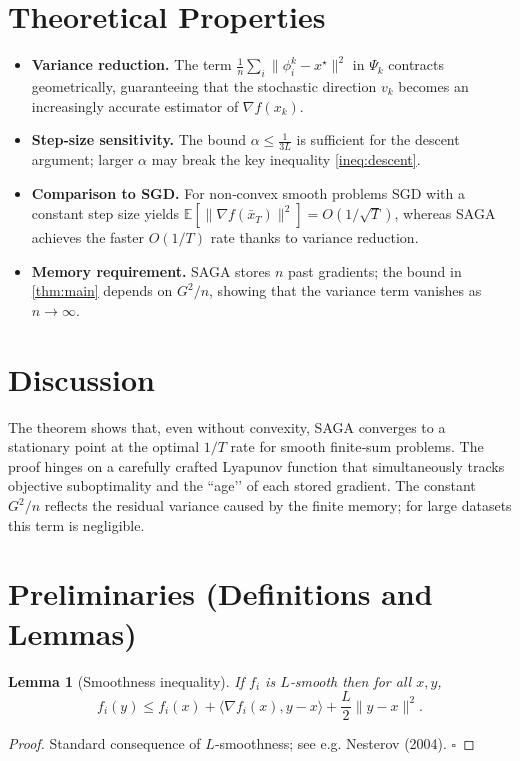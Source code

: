 \documentclass{article}
\newtheorem{lemma}{Lemma}
\newcommand{\EE}{\mathbb{E}}
\begin{document}
\section*{Theoretical Properties}
\begin{itemize}
    \item \textbf{Variance reduction.} The term $\frac{1}{n}\sum_{i}\|\phi_i^{k}-x^{\star}\|^{2}$ in $\Psi_k$ contracts geometrically, guaranteeing that the stochastic direction $v_k$ becomes an increasingly accurate estimator of $\nabla f(x_k)$.
    \item \textbf{Step‑size sensitivity.} The bound $\alpha\le \frac{1}{3L}$ is sufficient for the descent argument; larger $\alpha$ may break the key inequality \eqref{ineq:descent}.
    \item \textbf{Comparison to SGD.} For non‑convex smooth problems SGD with a constant step size yields $\EE[\|\nabla f(\bar x_T)\|^{2}]=O(1/\sqrt{T})$, whereas SAGA achieves the faster $O(1/T)$ rate thanks to variance reduction.
    \item \textbf{Memory requirement.} SAGA stores $n$ past gradients; the bound in \eqref{thm:main} depends on $G^{2}/n$, showing that the variance term vanishes as $n\to\infty$.
\end{itemize}

\section*{Discussion}
The theorem shows that, even without convexity, SAGA converges to a stationary point at the optimal $1/T$ rate for smooth finite‑sum problems. The proof hinges on a carefully crafted Lyapunov function that simultaneously tracks objective suboptimality and the “age’’ of each stored gradient. The constant $G^{2}/n$ reflects the residual variance caused by the finite memory; for large datasets this term is negligible.

\section*{Preliminaries (Definitions and Lemmas)}
\begin{lemma}[Smoothness inequality]\label{lem:smooth}
If $f_i$ is $L$‑smooth then for all $x,y$,
\[
f_i(y)\le f_i(x)+\langle\nabla f_i(x),y-x\rangle+\frac{L}{2}\|y-x\|^{2}.
\tag{6}
\]
\end{lemma}
\begin{proof}
Standard consequence of $L$‑smoothness; see e.g. Nesterov (2004). \hfill $\square$
\end{proof}
\end{document}
